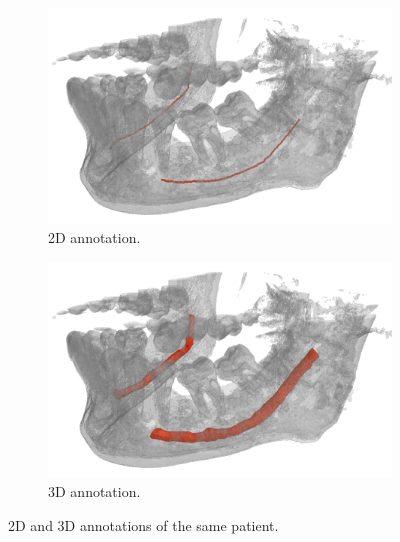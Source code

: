 \begin{figure}
  \centering
  \begin{subfigure}{.35\textwidth}
    \centering
    \includegraphics[width=\textwidth]{Images/sparse_annotation.png}
    \caption{2D annotation.}
    \label{fig:2dannot}
  \end{subfigure}
  \begin{subfigure}{0.35\textwidth}
    \centering
    \includegraphics[width=\textwidth]{Images/dense_annotation.png}
    \caption{3D annotation.}
    \label{fig:3dannot}
  \end{subfigure}
  \caption{2D and 3D annotations of the same patient.}
  \label{fig:2d3dannot}
\end{figure}


